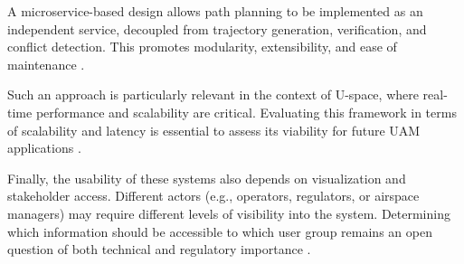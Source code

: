 A microservice-based design allows path planning to be implemented as an 
independent service, decoupled from trajectory generation, verification, and 
conflict detection. This promotes modularity, extensibility, and ease of 
maintenance \cite{dragoni2017microservices, matlekovic2020uav}. 

Such an approach is particularly relevant in the context of U-space, where 
real-time performance and scalability are critical. Evaluating this framework 
in terms of scalability and latency is essential to assess its viability for 
future UAM applications \cite{kopardekar2016utm}. 

Finally, the usability of these systems also depends on visualization and 
stakeholder access. Different actors (e.g., operators, regulators, or 
airspace managers) may require different levels of visibility into the 
system. Determining which information should be accessible to which user 
group remains an open question of both technical and regulatory importance 
\cite{sesar_master_plan_2025}.
